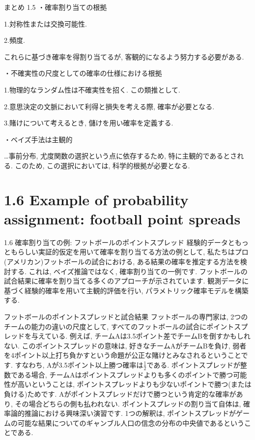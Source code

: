 \documentclass[10pt,dvipdfmx,a4]{beamer}
\begin{document}
\begin{frame}{まとめ 1.5}
・確率割り当ての根拠

1.対称性または交換可能性.

2.頻度.

これらに基づき確率を得割り当てるが, 客観的になるよう努力する必要がある.


・不確実性の尺度としての確率の仕様における根拠

1.物理的なランダム性は不確実性を招く.
この類推として.

2.意思決定の文脈において利得と損失を考える際, 確率が必要となる.

3.賭けについて考えるとき, 儲けを用い確率を定義する.

・ベイズ手法は主観的

…事前分布, 尤度関数の選択という点に依存するため, 特に主観的であるとされる.
このため, この選択においては, 科学的根拠が必要となる.
\end{frame}

\section{1.6 Example of probability assignment: football point spreads}
\begin{frame}{1.6 確率割り当ての例: フットボールのポイントスプレッド}
経験的データともっともらしい実証的仮定を用いて確率を割り当てる方法の例として, 私たちはプロ(アメリカン)フットボールの試合における, ある結果の確率を推定する方法を検討する.
これは, ベイズ推論ではなく, 確率割り当ての一例です.
フットボールの試合結果に確率を割り当てる多くのアプローチが示されています.
観測データに基づく経験的確率を用いて主観的評価を行い, パラメトリック確率モデルを構築する.
\end{frame}


\begin{frame}{フットボールのポイントスプレッドと試合結果}
フットボールの専門家は, 2つのチームの能力の違いの尺度として, すべてのフットボールの試合にポイントスプレッドを与えている.
例えば, チームAは3.5ポイント差でチームBを倒すかもしれない.
このポイントスプレッドの意味は, 好きなチームAがチームBを負け, 弱者を4ポイント以上打ち負かすという命題が公正な賭けとみなされるということです.
すなわち, Aが3.5ポイント以上勝つ確率は$\tfrac{1}{2}$である.
ポイントスプレッドが整数である場合, チームAはポイントスプレッドよりも多くのポイントで勝つ可能性が高いということは, ポイントスプレッドよりも少ないポイントで勝つ(または負ける)ためです.
Aがポイントスプレッドだけで勝つという肯定的な確率があり, その場合どちらの側も払われない.
ポイントスプレッドの割り当て自体は, 確率論的推論における興味深い演習です.
1つの解釈は, ポイントスプレッドがゲームの可能な結果についてのギャンブル人口の信念の分布の中央値であるということである.
\end{frame}
\end{document}
